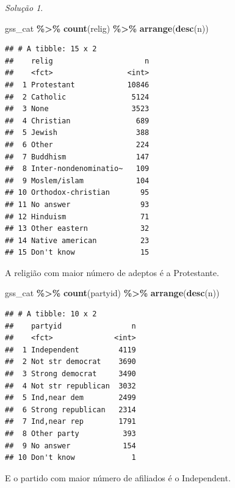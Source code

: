 \documentclass[
]{latex/krantz}
\newenvironment{Shaded}{\begin{snugshade}}{\end{snugshade}}
\newcommand{\FunctionTok}[1]{\textcolor[rgb]{0.13,0.29,0.53}{\textbf{#1}}}
\newcommand{\NormalTok}[1]{#1}
\newcommand{\SpecialCharTok}[1]{\textcolor[rgb]{0.81,0.36,0.00}{\textbf{#1}}}
\theoremstyle{definition}
\theoremstyle{definition}
\theoremstyle{definition}
\theoremstyle{definition}
\theoremstyle{remark}
\newtheorem*{solution}{Solução}
\begin{document}
\begin{solution}
\leavevmode

\begin{Shaded}
\begin{Highlighting}[]
\NormalTok{gss\_cat }\SpecialCharTok{\%\textgreater{}\%}
  \FunctionTok{count}\NormalTok{(relig) }\SpecialCharTok{\%\textgreater{}\%}
  \FunctionTok{arrange}\NormalTok{(}\FunctionTok{desc}\NormalTok{(n))}
\end{Highlighting}
\end{Shaded}

\begin{verbatim}
## # A tibble: 15 x 2
##    relig                     n
##    <fct>                 <int>
##  1 Protestant            10846
##  2 Catholic               5124
##  3 None                   3523
##  4 Christian               689
##  5 Jewish                  388
##  6 Other                   224
##  7 Buddhism                147
##  8 Inter-nondenominatio~   109
##  9 Moslem/islam            104
## 10 Orthodox-christian       95
## 11 No answer                93
## 12 Hinduism                 71
## 13 Other eastern            32
## 14 Native american          23
## 15 Don't know               15
\end{verbatim}

A religião com maior número de adeptos é a Protestante.

\begin{Shaded}
\begin{Highlighting}[]
\NormalTok{gss\_cat }\SpecialCharTok{\%\textgreater{}\%}
  \FunctionTok{count}\NormalTok{(partyid) }\SpecialCharTok{\%\textgreater{}\%}
  \FunctionTok{arrange}\NormalTok{(}\FunctionTok{desc}\NormalTok{(n))}
\end{Highlighting}
\end{Shaded}

\begin{verbatim}
## # A tibble: 10 x 2
##    partyid                n
##    <fct>              <int>
##  1 Independent         4119
##  2 Not str democrat    3690
##  3 Strong democrat     3490
##  4 Not str republican  3032
##  5 Ind,near dem        2499
##  6 Strong republican   2314
##  7 Ind,near rep        1791
##  8 Other party          393
##  9 No answer            154
## 10 Don't know             1
\end{verbatim}

E o partido com maior número de afiliados é o Independent.

\end{solution}
\end{document}
